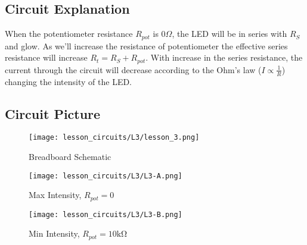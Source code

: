 \subsection{Circuit Explanation}
When the potentiometer resistance $R_{pot}$ is $0\Omega$, the LED will be in series with $R_S$ and glow. As we'll increase the resistance of potentiometer the effective series resistance will increase $R_t = R_S + R_{pot}$. With increase in the series resistance, the current through the circuit will decrease according to the Ohm's law ($I \propto \frac{1}{R}$) changing the intensity of the LED.
\subsection{Circuit Picture}
\begin{figure}[!h]
    \centering
    \texttt{[image: lesson\_circuits/L3/lesson\_3.png]}
    \caption{Breadboard Schematic}
    \label{fig:pot_led_sch}
\end{figure}
\begin{figure}[!h]
    \centering
    \texttt{[image: lesson\_circuits/L3/L3-A.png]}
    \caption{Max Intensity, $R_{pot} = 0$}
    \label{fig:pot_led_max}
\end{figure}
\begin{figure}[!h]
    \centering
    \texttt{[image: lesson\_circuits/L3/L3-B.png]}
    \caption{Min Intensity, $R_{pot} = 10\si{\kilo\ohm}$}
    \label{fig:pot_led_min}
\end{figure}


